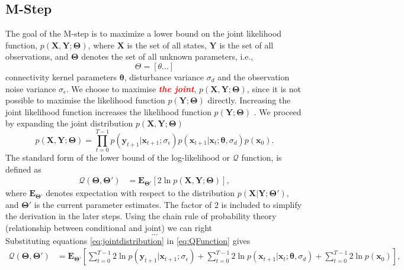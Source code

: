 \documentclass[]{article}
\newcommand{\dean}[1]{\textsf{\emph{\textbf{\textcolor{red}{#1}}}}}
\begin{document}
\subsection{M-Step}
The goal of the M-step is to maximize a lower bound on the joint likelihood function, $p(\mathbf X,\mathbf Y;\boldsymbol \Theta)$, where $\mathbf X$ is the set of all states, $\mathbf Y$ is the set of all observations, and $\boldsymbol \Theta$ denotes the set of all unknown parameters, i.e.,
\begin{equation}
	\Theta = [\theta ...]
\end{equation}
 connectivity kernel parameters $\boldsymbol\theta$, disturbance variance $\sigma_d$ and the observation noise variance $\sigma_{\epsilon}$. We choose to maximise \dean{the joint}, $p(\mathbf X,\mathbf Y;\boldsymbol \Theta)$, since it is not  possible to maximise the likelihood function $p(\mathbf Y;\boldsymbol\Theta)$ directly. Increasing the joint likelihood function increases the likelihood function $p(\mathbf Y;\boldsymbol \Theta)$ \cite{McLachlan1997}. We proceed by expanding the joint distribution $p(\mathbf X,\mathbf Y;\boldsymbol \Theta)$
\begin{equation}\label{eq:jointdistribution}
 p(\mathbf X,\mathbf Y;\boldsymbol \Theta)=\prod_{t=0}^{T-1} p(\mathbf y_{t+1}|\mathbf x_{t+1}; \sigma_{\epsilon})p(\mathbf x_{t+1}|\mathbf x_{t};\boldsymbol \theta, \sigma_d)p(\mathbf x_0).
\end{equation}
The standard form of the lower bound of the log-likelihood or $\mathcal{Q}$ function, is defined as   
\begin{align}\label{eq:QFunction}
 \mathcal Q(\boldsymbol \Theta,\boldsymbol\Theta')&=\mathbf E_{\boldsymbol \Theta'}\left[2\ln p(\mathbf X,\mathbf Y;\boldsymbol \Theta)\right],
\end{align}
where $ \mathbf E_{\boldsymbol \Theta'}$ denotes expectation with respect to the distribution $p(\mathbf X | \mathbf Y;\boldsymbol \Theta')$, and $\boldsymbol \Theta'$ is the current parameter estimates. The factor of $2$ is included to simplify the derivation in the later steps. Using the chain rule of probability theory (relationship between conditional and joint) we can right
\begin{equation}
	... \nonumber
\end{equation}
 Substituting equations \ref{eq:jointdistribution} in \ref{eq:QFunction} gives
\begin{align}
 \mathcal Q(\boldsymbol \Theta,\boldsymbol\Theta')&=\mathbf E_{\boldsymbol\Theta'}\left[\sum_{t=0}^{T-1}2\ln p(\mathbf y_{t+1}|\mathbf x_{t+1};\sigma_{\epsilon})+\sum_{t=0}^{T-1}2\ln p(\mathbf x_{t+1}|\mathbf x_{t};\boldsymbol \theta, \sigma_d)+\sum_{t=0}^{T-1}2\ln p(\mathbf x_0)\right],
\end{align}
\end{document}
